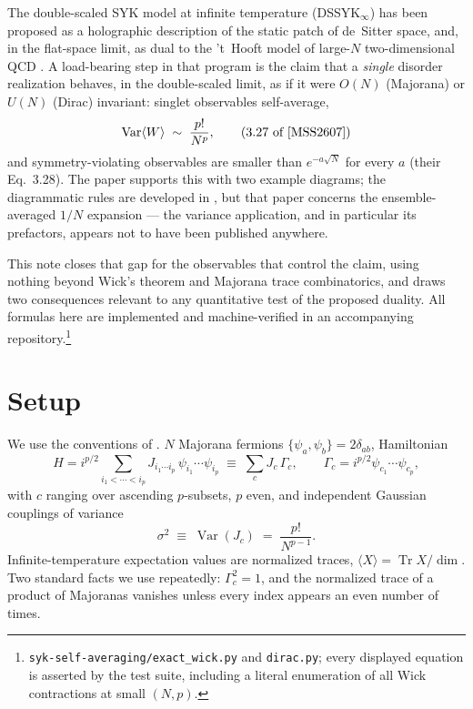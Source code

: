 \documentclass[11pt]{article}
\newcommand{\Tr}{\operatorname{Tr}}
\newcommand{\Var}{\operatorname{Var}}
\begin{document}
The double-scaled SYK model at infinite temperature (DSSYK$_\infty$) has been
proposed as a holographic description of the static patch of de~Sitter space,
and, in the flat-space limit, as dual to the 't~Hooft model of large-$N$
two-dimensional QCD \cite{MSS2607,SS2501,MSS2506}. A load-bearing step in that
program is the claim that a \emph{single} disorder realization behaves, in the
double-scaled limit, as if it were $O(N)$ (Majorana) or $U(N)$ (Dirac)
invariant: singlet observables self-average,
\begin{equation}
\Var\langle W\rangle \;\sim\; \frac{p!}{N^p},
\tag{3.27 of \cite{MSS2607}}
\end{equation}
and symmetry-violating observables are smaller than $e^{-a\sqrt N}$ for every
$a$ (their Eq.~3.28). The paper supports this with two example
diagrams; the diagrammatic rules are developed in \cite{SS2501}, but that paper
concerns the ensemble-averaged $1/N$ expansion --- the variance application, and
in particular its prefactors, appears not to have been published anywhere.

This note closes that gap for the observables that control the claim, using
nothing beyond Wick's theorem and Majorana trace combinatorics, and draws two
consequences relevant to any quantitative test of the proposed duality. All
formulas here are implemented and machine-verified in an accompanying
repository.\footnote{\texttt{syk-self-averaging/exact\_wick.py} and
\texttt{dirac.py}; every displayed equation is asserted by the test suite,
including a literal enumeration of all Wick contractions at small $(N,p)$.}

\section{Setup}

We use the conventions of \cite{MSS2607}. $N$ Majorana fermions
$\{\psi_a,\psi_b\}=2\delta_{ab}$, Hamiltonian
\begin{equation}
H=i^{p/2}\!\!\sum_{i_1<\cdots<i_p}\!\! J_{i_1\cdots i_p}\,
\psi_{i_1}\cdots\psi_{i_p}
\;\equiv\;\sum_c J_c\,\Gamma_c ,
\qquad
\Gamma_c=i^{p/2}\psi_{c_1}\cdots\psi_{c_p},
\end{equation}
with $c$ ranging over ascending $p$-subsets, $p$ even, and independent Gaussian
couplings of variance
\begin{equation}
\sigma^2 \;\equiv\; \Var(J_c) \;=\; \frac{p!}{N^{p-1}} .
\end{equation}
Infinite-temperature expectation values are normalized traces,
$\langle X\rangle=\Tr X/\dim$. Two standard facts we use repeatedly:
$\Gamma_c^2=1$, and the normalized trace of a product of Majoranas vanishes
unless every index appears an even number of times.
\end{document}
